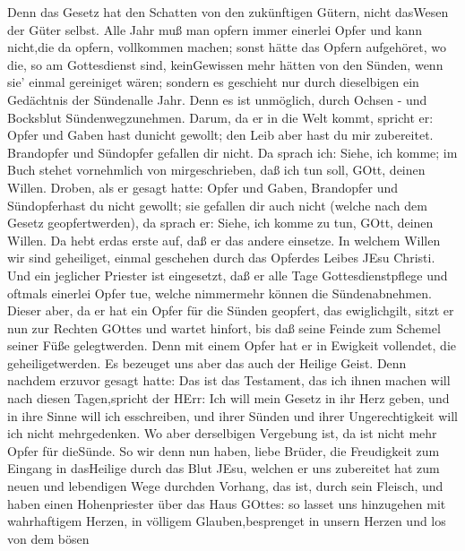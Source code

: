  Denn das Gesetz hat den Schatten von den zukünftigen
Gütern, nicht dasWesen der Güter selbst. Alle Jahr muß man opfern immer
einerlei Opfer und kann nicht,die da opfern, vollkommen machen;
 sonst hätte das Opfern aufgehöret, wo die, so am
Gottesdienst sind, keinGewissen mehr hätten von den Sünden, wenn sie'
einmal gereiniget wären;  sondern es geschieht nur durch
dieselbigen ein Gedächtnis der Sündenalle Jahr.  Denn es ist
unmöglich, durch Ochsen - und Bocksblut Sündenwegzunehmen. 
Darum, da er in die Welt kommt, spricht er: Opfer und Gaben hast dunicht
gewollt; den Leib aber hast du mir zubereitet.  Brandopfer
und Sündopfer gefallen dir nicht.  Da sprach ich: Siehe, ich
komme; im Buch stehet vornehmlich von mirgeschrieben, daß ich tun soll,
GOtt, deinen Willen.  Droben, als er gesagt hatte: Opfer und
Gaben, Brandopfer und Sündopferhast du nicht gewollt; sie gefallen dir
auch nicht (welche nach dem Gesetz geopfertwerden),  da
sprach er: Siehe, ich komme zu tun, GOtt, deinen Willen. Da hebt erdas
erste auf, daß er das andere einsetze.  In welchem Willen
wir sind geheiliget, einmal geschehen durch das Opferdes Leibes JEsu
Christi.  Und ein jeglicher Priester ist eingesetzt, daß er
alle Tage Gottesdienstpflege und oftmals einerlei Opfer tue, welche
nimmermehr können die Sündenabnehmen.  Dieser aber, da er
hat ein Opfer für die Sünden geopfert, das ewiglichgilt, sitzt er nun
zur Rechten GOttes  und wartet hinfort, bis daß seine
Feinde zum Schemel seiner Füße gelegtwerden.  Denn mit
einem Opfer hat er in Ewigkeit vollendet, die geheiligetwerden.
 Es bezeuget uns aber das auch der Heilige Geist. Denn
nachdem erzuvor gesagt hatte:  Das ist das Testament, das
ich ihnen machen will nach diesen Tagen,spricht der HErr: Ich will mein
Gesetz in ihr Herz geben, und in ihre Sinne will ich esschreiben,
 und ihrer Sünden und ihrer Ungerechtigkeit will ich nicht
mehrgedenken.  Wo aber derselbigen Vergebung ist, da ist
nicht mehr Opfer für dieSünde.  So wir denn nun haben,
liebe Brüder, die Freudigkeit zum Eingang in dasHeilige durch das Blut
JEsu,  welchen er uns zubereitet hat zum neuen und
lebendigen Wege durchden Vorhang, das ist, durch sein Fleisch,
 und haben einen Hohenpriester über das Haus GOttes:
 so lasset uns hinzugehen mit wahrhaftigem Herzen, in
völligem Glauben,besprenget in unsern Herzen und los von dem bösen
